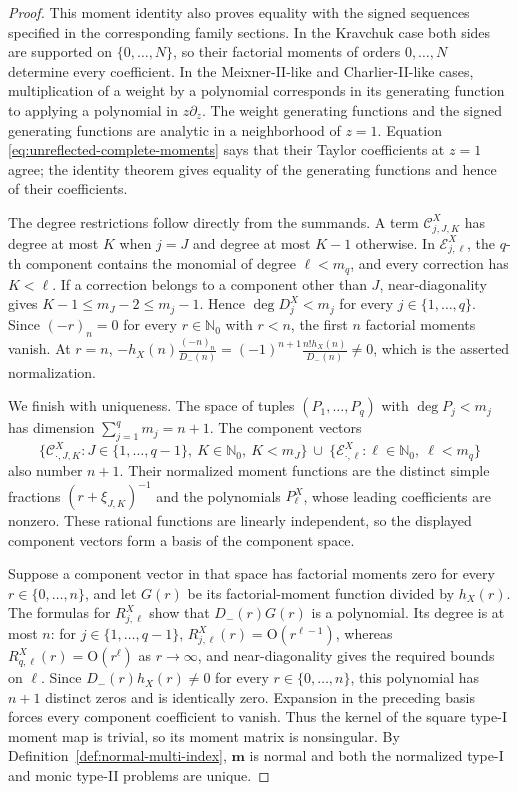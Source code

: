 \documentclass[10pt,a4paper]{amsart}
\newcommand{\Nzero}{\mathbb N_0}
\newcommand{\mm}{\boldsymbol m}
\begin{document}
\begin{proof}
This moment identity also proves equality with the signed sequences
specified in the corresponding family sections.  In the Kravchuk case both sides are supported on
\(\{0,\ldots,N\}\), so their factorial moments of orders
\(0,\ldots,N\) determine every coefficient.  In the Meixner-II-like and
Charlier-II-like cases, multiplication of a weight by a polynomial
corresponds in its generating function to applying a polynomial in
\(z\partial_z\). The weight generating functions and the signed generating
functions are analytic in a neighborhood of \(z=1\).  Equation
\eqref{eq:unreflected-complete-moments} says that their Taylor
coefficients at \(z=1\) agree; the identity theorem gives equality of the
generating functions and hence of their coefficients.

The degree restrictions follow directly from the summands. A term
\(\mathcal C_{j,J,K}^X\) has degree at most \(K\) when \(j=J\) and degree
at most \(K-1\) otherwise. In \(\mathcal E_{j,\ell}^X\), the \(q\)-th component
contains the monomial of degree \(\ell<m_q\), and every correction has
\(K<\ell\). If a correction belongs to a component other than \(J\),
near-diagonality gives
\(K-1\le m_J-2\le m_j-1\).  Hence
\(\deg D_j^X<m_j\) for every \(j\in\{1,\ldots,q\}\). Since
\((-r)_n=0\) for every \(r\in\Nzero\) with \(r<n\), the first \(n\)
factorial moments
vanish. At \(r=n\),
\(-h_X(n)\frac{(-n)_n}{D_-(n)}
=(-1)^{n+1}\frac{n!h_X(n)}{D_-(n)}\ne0\), which is the asserted
normalization.

We finish with uniqueness. The space of tuples
\((P_1,\ldots,P_q)\) with \(\deg P_j<m_j\) has dimension
\(\sum_{j=1}^q m_j=n+1\). The component vectors
\[
 \{\mathcal C_{\cdot,J,K}^X:J\in\{1,\ldots,q-1\},\
 K\in\Nzero,\ K<m_J\}
 \ \cup\
 \{\mathcal E_{\cdot,\ell}^X:\ell\in\Nzero,\ \ell<m_q\}
\]
also number \(n+1\). Their normalized moment functions are the distinct simple
fractions \((r+\xi_{J,K})^{-1}\) and the polynomials
\(P_\ell^X\), whose leading coefficients are nonzero.  These rational
functions are linearly independent, so the displayed component vectors
form a basis of the component space.

Suppose a component vector in that space has factorial moments zero for
every \(r\in\{0,\ldots,n\}\), and let \(G(r)\) be its factorial-moment
function divided by \(h_X(r)\).
The formulas for \(R_{j,\ell}^X\) show that \(D_-(r)G(r)\) is a
polynomial. Its degree is at most \(n\): for
\(j\in\{1,\ldots,q-1\}\),
\(R_{j,\ell}^X(r)=\mathrm O(r^{\ell-1})\), whereas
\(R_{q,\ell}^X(r)=\mathrm O(r^\ell)\) as \(r\to\infty\), and
near-diagonality gives the required bounds on \(\ell\).  Since
\(D_-(r)h_X(r)\ne0\) for every \(r\in\{0,\ldots,n\}\), this polynomial has \(n+1\)
distinct zeros and is identically zero. Expansion in the preceding basis
forces every component coefficient to vanish. Thus the kernel of the
square type-I moment map is trivial, so its moment matrix is nonsingular.
By Definition~\ref{def:normal-multi-index}, \(\mm\) is normal and both the
normalized type-I and monic type-II problems are unique.
\end{proof}
\end{document}
